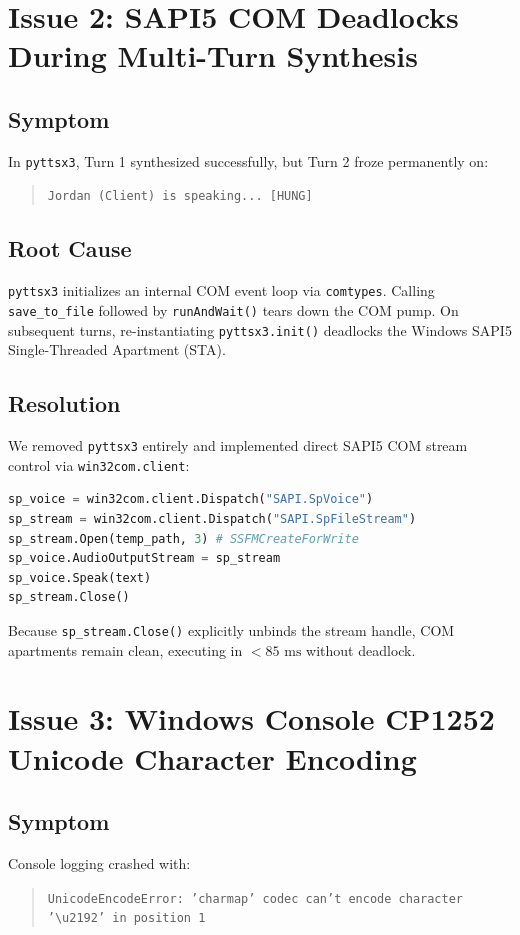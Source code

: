 \documentclass[11pt,a4paper,titlepage]{report}
\begin{document}
\section{Issue 2: SAPI5 COM Deadlocks During Multi-Turn Synthesis}
\subsection{Symptom}
In \texttt{pyttsx3}, Turn 1 synthesized successfully, but Turn 2 froze permanently on:
\begin{quote}
    \texttt{Jordan (Client) is speaking... [HUNG]}
\end{quote}

\subsection{Root Cause}
\texttt{pyttsx3} initializes an internal COM event loop via \texttt{comtypes}. Calling \texttt{save\_to\_file} followed by \texttt{runAndWait()} tears down the COM pump. On subsequent turns, re-instantiating \texttt{pyttsx3.init()} deadlocks the Windows SAPI5 Single-Threaded Apartment (STA).

\subsection{Resolution}
We removed \texttt{pyttsx3} entirely and implemented direct SAPI5 COM stream control via \texttt{win32com.client}:
\begin{lstlisting}[language=Python]
sp_voice = win32com.client.Dispatch("SAPI.SpVoice")
sp_stream = win32com.client.Dispatch("SAPI.SpFileStream")
sp_stream.Open(temp_path, 3) # SSFMCreateForWrite
sp_voice.AudioOutputStream = sp_stream
sp_voice.Speak(text)
sp_stream.Close()
\end{lstlisting}
Because \texttt{sp\_stream.Close()} explicitly unbinds the stream handle, COM apartments remain clean, executing in $<85\text{ ms}$ without deadlock.

\section{Issue 3: Windows Console CP1252 Unicode Character Encoding}
\subsection{Symptom}
Console logging crashed with:
\begin{quote}
    \texttt{UnicodeEncodeError: 'charmap' codec can't encode character '\textbackslash u2192' in position 1}
\end{quote}
\end{document}
